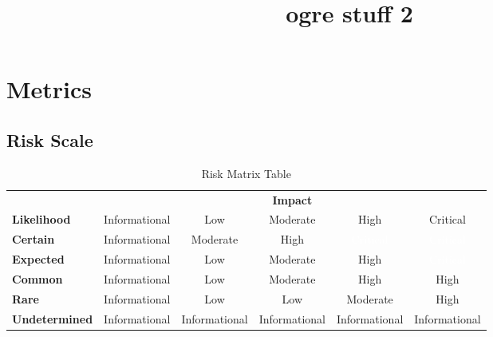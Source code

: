 \documentclass[11pt,oneside,a4paper]{book}
\title{ogre stuff 2}
\begin{document}
\tableofcontents

\newpage

\section{Metrics}

\subsection{Risk Scale}
\begin{table}[h!]
    \centering
    \renewcommand{\arraystretch}{1.5}
    \setlength{\tabcolsep}{6pt}
    \begin{tabularx}{\linewidth}{|X|c|c|c|c|c|}
        \hline
        \rowcolor{gray!30} & \multicolumn{5}{c|}{\textbf{Impact}} \\ \cline{2-6}
        \rowcolor{white} \cellcolor{gray!30}\textbf{Likelihood} & Informational & Low & Moderate & High & Critical \\ \hline
        \textbf{Certain} & \cellcolor{Informational}Informational & \cellcolor{Medium}Moderate & \cellcolor{High}High & \textcolor{white}{\cellcolor{Critical}Critical} & \textcolor{white}{\cellcolor{Critical}Critical} \\ \hline
        \textbf{Expected} & \cellcolor{Informational}Informational & \cellcolor{Low}Low & \cellcolor{Medium}Moderate & \cellcolor{High}High & \textcolor{white}{\cellcolor{Critical}Critical} \\ \hline
        \textbf{Common} & \cellcolor{Informational}Informational & \cellcolor{Low}Low & \cellcolor{Medium}Moderate & \cellcolor{High}High & \cellcolor{High}High \\ \hline
        \textbf{Rare} & \cellcolor{Informational}Informational & \cellcolor{Low}Low & \cellcolor{Low}Low & \cellcolor{Medium}Moderate & \cellcolor{High}High \\ \hline
        \textbf{Undetermined} & \cellcolor{Informational}Informational & \cellcolor{Informational}Informational & \cellcolor{Informational}Informational & \cellcolor{Informational}Informational & \cellcolor{Informational}Informational \\ \hline
    \end{tabularx}
    \caption{Risk Matrix Table}
    \label{tab:risk_matrix}
\end{table}
\end{document}
